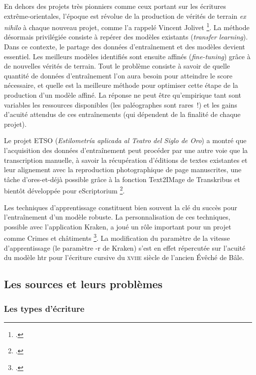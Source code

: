 \documentclass[a4paper,12pt,twoside]{book}
\newcommand{\siecle}[1]{\textsc{#1}\ieme}
\begin{document}
				En dehors des projets très pionniers comme ceux portant sur les
				écritures extrême-orientales, l'époque est révolue de la production de
				vérités de terrain \textit{ex nihilo} à chaque nouveau projet, comme l'a
				rappelé Vincent Jolivet
				\footcite{torresaguilarModelisationAffinageHTR2022}.
				La méthode désormais privilégiée consiste à repérer des modèles
				existants (\textit{transfer learning}). Dans ce contexte, le partage des
				données d'entraînement et des modèles devient essentiel. Les meilleurs
				modèles identifiés sont ensuite affinés (\textit{fine-tuning}) grâce à de nouvelles vérités de terrain. Tout le problème consiste à savoir de
				quelle quantité de données d'entraînement l'on aura besoin pour
				atteindre le score nécessaire, et quelle est la meilleure méthode pour
				optimiser cette étape de la production d'un modèle affiné. La réponse ne
				peut être qu'empirique tant sont variables les ressources disponibles 
				(les paléographes sont rares~!) et les gains d'acuité attendus de ces
				entraînements (qui dépendent de la finalité de chaque projet).
				
				Le projet ETSO (\textit{Estilometría aplicada al Teatro del Siglo de Oro})
				a montré que l'acquisition des données d'entraînement peut
				procéder par une autre voie que la transcription manuelle, à savoir la
				récupération d'éditions de textes existantes et leur alignement avec la
				reproduction photographique de page manuscrites, une tâche
				d'ores-et-déjà possible grâce à la fonction Text2IMage de Transkribus et
				bientôt développée pour eScriptorium
				\footcite{cuellarModeleOuvertPour2022}.
				
				Les techniques d'apprentissage constituent bien souvent la clé du succès
				pour l'entraînement d'un modèle robuste. La personnalisation de ces
				techniques, possible avec l'application Kraken, a joué un rôle important
				pour un projet comme \og Crimes et châtiments \fg{} \footcite{paupeCursiveXVIIeSiecle2022}. La modification du paramètre de la
				vitesse d'apprentissage (le paramètre \textsf{-r}  de Kraken) s'est en effet répercutée sur l'acuité du modèle \gls{htr} pour l'écriture cursive du \siecle{xviie} siècle de l'ancien Évêché de Bâle.
			
			\subsection{Les sources et leurs problèmes}
			
				\subsubsection{Les types d'écriture}
				
\end{document}
